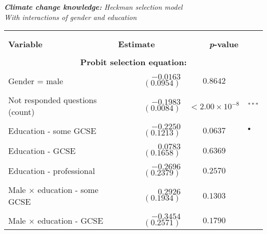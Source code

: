 \documentclass[a4paper,12pt]{article}
\begin{document}
{\centering \singlespacing
\begin{threeparttable}
\caption{\textit{\textbf{Climate change knowledge:} Heckman selection model \\ With interactions of gender and education}}
\label{KnowHeckman2} 
\centering
\begin{small}
\begin{tabular}{lrcl} 
\hline \vspace{-0.3cm} \\
  \vspace{-0.2cm} \\
  \multicolumn{1}{l}{\vspace{0.25cm}\textbf{Variable}} & \multicolumn{1}{l}{\textbf{Estimate}} &  \multicolumn{2}{c}{\textbf{\textit{p}-value}} \\
 \hline 
\hline
 \vspace{-0.25cm} \\
   \multicolumn{4}{c}{\vspace{0.1cm}\textbf{Probit selection equation:\tnote{a}}}\\
   \hline
   \\
 \vspace{-0.2cm}Gender = male&$-0.0163$ $(0.0954)$ &$0.8642$&\\
  \\
 \vspace{-0.2cm}Not responded questions (count)&$-0.1983$ $(0.0084)$ &$<2.00\times 10^{-8}$&$^{***}$ \\
\\
 \vspace{-0.2cm}Education - some GCSE&$-0.2250$ $(0.1213)$ &$0.0637$&$^{\bullet}$ \\
\\
  \vspace{-0.2cm}Education - GCSE&$0.0783$ $(0.1658)$ &$0.6369$&\\
  \\
  \vspace{-0.2cm}Education -  professional&$-0.2696$ $(0.2379)$ &$0.2570$&\\
\\
  \vspace{-0.2cm}Male $\times$ education - some GCSE&$0.2926$ $(0.1934)$ &$0.1303$&\\
\\
  \vspace{-0.2cm}Male $\times$ education - GCSE&$-0.3454$ $(0.2571)$ &$0.1790$&\\

\end{tabular}
\end{small}
\end{threeparttable}}
\end{document}
